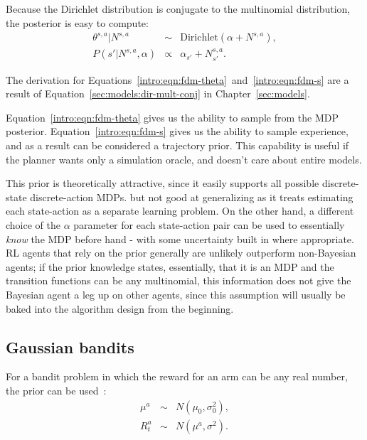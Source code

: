 Because the Dirichlet distribution is conjugate to the multinomial distribution, the  posterior is easy to compute:
\begin{eqnarray}
\label{intro:eqn:fdm-theta}\theta^{s,a}|N^{s,a} &\sim& \mbox{Dirichlet}(\alpha+N^{s,a}),\\
\label{intro:eqn:fdm-s}P(s'|N^{s,a},\alpha) &\propto& \alpha_{s'}+N^{s,a}_{s'}.
\end{eqnarray}

The derivation for Equations~\ref{intro:eqn:fdm-theta}~and~\ref{intro:eqn:fdm-s} are a result of Equation~\ref{sec:models:dir-mult-conj} in Chapter~\ref{sec:models}.

Equation~\ref{intro:eqn:fdm-theta} gives us the ability to sample from the MDP posterior. Equation~\ref{intro:eqn:fdm-s} gives us the ability to sample experience, and as a result  can be considered a trajectory prior. This capability is useful if the planner wants only a simulation oracle, and doesn't care about entire models.

This prior is theoretically attractive, since it easily supports all possible discrete-state discrete-action MDPs. but not good at generalizing as it treats estimating each state-action as a separate learning problem. On the other hand, a different choice of the $\alpha$ parameter for each state-action pair can be used to essentially \emph{know} the MDP before hand - with some uncertainty built in where appropriate. RL agents that rely on the  prior generally are unlikely outperform non-Bayesian agents; if the prior knowledge states, essentially, that it is an MDP and the transition functions can be any multinomial, this information does not give the Bayesian agent a leg up on other agents, since this assumption will usually be baked into the algorithm design from the beginning.

\subsection{Gaussian bandits}

For a bandit problem in which the reward for an arm can be any real number, the  prior can be used~\cite{wang05}:
\begin{eqnarray}
\label{intro:eqn:gband-mu}\mu^a &\sim& N(\mu_0, \sigma^2_0),\\
\label{intro:eqn:gband-r}R_t^a &\sim& N(\mu^a, \sigma^2).
\end{eqnarray}

